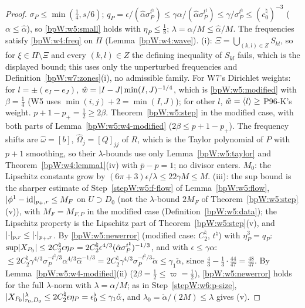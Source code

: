 \begin{proof}
\label{stepW:w6:p-data} $\sigma_P\le\min(\frac14,s/6)$; $q_P=\epsilon/(\hat\alpha\sigma_P^{t^\natural})\le\gamma\alpha/(\hat\alpha\sigma_P^{t^\natural})\le\gamma/\sigma_P^{t^\natural}\le(c^\natural_0)^{-3}$
($\alpha\le\hat\alpha$), so \eqref{bpW:w5:small} holds with $\eta_P\le\frac18$; $\lambda=\alpha/M\le\hat\alpha/M$. The frequencies satisfy
\eqref{bpW:w4:freq} on $\Pi$ (Lemma~\ref{bpW:w4:wave}).
\label{stepW:w6:p-div} (i): $\Xi=\bigcup_{(k,l)\in Z}S_{kl}$, so for $\xi\in\Pi\setminus\Xi$ and every $(k,l)\in Z$
the defining inequality of $S_{kl}$ fails, which is the displayed bound; this uses only the unperturbed frequencies and
Definition~\ref{bpW:w7:zones}(i), no admissible family. For W7's Dirichlet weights: for $l=\pm(e_I-e_J)$,
$\hat w=\lvert I-J\rvert\min(I,J)^{-1/4}$, which is \eqref{bpW:w5:modified} with $\beta=\frac14$ (W5 uses $\min(i,j)+2=\min(I,J)$); for other $l$,
$\hat w=\langle l\rangle\ge$ P96-K's weight. $p+1-p_+=\frac12\ge2\beta$.
\label{stepW:w6:p-step} Theorem~\ref{bpW:w5:step} in the modified case, with both parts of
Lemma~\ref{bpW:w5:w4-modified} ($2\beta\le p+1-p_+$). The frequency shifts are
$\hat\omega=[b]$, $\hat\Omega_j=[Q]_{jj}$ of $R$, which is the Taylor polynomial of $P$ with $p+1$ smoothing, so their $\lambda$-bounds use
only Lemma~\ref{bpW:w5:taylor} and Theorem~\ref{bpW:w4:lemma1}(iv) with $\bar p-p=1$; no divisor enters. $M_0$: the Lipschitz constants grow
by $(6\pi+3)\epsilon/\lambda\le22\gamma M\le M$.
\label{stepW:w6:p-lipp} (iii): the sup bound is the sharper estimate of Step~\ref{stepW:w5:f-flow}
of Lemma~\ref{bpW:w5:flow}, $\lvert \phi^1-\mathrm{id}\rvert_{p_+,r}\le M_F$ on $U\supset D_0$ (not the $\lambda$-bound $2M_F$ of
Theorem~\ref{bpW:w5:step}(v)), with $M_F=M_{F,P}$ in the modified case (Definition~\ref{bpW:w5:data}); the Lipschitz property is the
Lipschitz part of Theorem~\ref{bpW:w5:step}(v), and $\lvert \cdot\rvert_{p,r}\le\lvert \cdot\rvert_{p_+,r}$.
\label{stepW:w6:p-size} By \eqref{bpW:w5:newerror} (modified case: $C^\natural_2$, $t^\natural$) with $\eta_P^3=q_P$:
$\sup\lvert X_{P_0}\rvert\le2C^\natural_2\epsilon\eta_P=2C^\natural_2\epsilon^{4/3}(\hat\alpha\sigma_P^{t^\natural})^{-1/3}$,
and with $\epsilon\le\gamma\alpha$: $\le2C^\natural_2\gamma^{4/3}\sigma_P^{-t^\natural/3}\alpha^{4/3}\hat\alpha^{-1/3}=2C^\natural_2\gamma^{4/3}\sigma_P^{-t^\natural/3}\check\alpha\le\gamma_1\check\alpha$,
since $\frac43-\frac13\cdot\frac{44}{47}=\frac{48}{47}$.
\label{stepW:w6:p-gap} By Lemma~\ref{bpW:w5:w4-modified}(ii) ($2\beta=\frac12\le\varpi=\frac12$), \eqref{bpW:w5:newerror}
holds for the full $\lambda$-norm with $\lambda=\alpha/M$; as in Step~\ref{stepW:w6:p-size},
$\lvert X_{P_0}\rvert^\lambda_{r_0,D_0}\le2C^\natural_2\epsilon\eta_P=\epsilon^\flat_0\le\gamma_1\check\alpha$, and $\lambda_0=\check\alpha/(2M)\le\lambda$ gives (v).
\end{proof}
